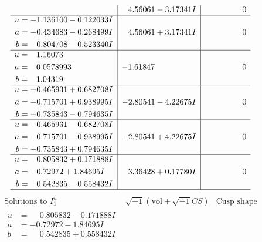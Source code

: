 \documentclass[1p]{elsarticle_modified}
\theoremstyle{definition}
\newcommand{\I}{\sqrt{-1}}
\begin{document}
$$\begin{array}{c|c|c}
 & \phantom{-}4.56061 - 3.17341 I & \phantom{-0.000000 } 0 \\ \hline\begin{aligned}
u &= -1.136100 - 0.122033 I \\
a &= -0.434683 - 0.268499 I \\
b &= \phantom{-}0.804708 - 0.523340 I\end{aligned}
 & \phantom{-}4.56061 + 3.17341 I & \phantom{-0.000000 } 0 \\ \hline\begin{aligned}
u &= \phantom{-}1.16073\phantom{ +0.000000I} \\
a &= \phantom{-}0.0578993\phantom{ +0.000000I} \\
b &= \phantom{-}1.04319\phantom{ +0.000000I}\end{aligned}
 & -1.61847\phantom{ +0.000000I} & \phantom{-0.000000 } 0 \\ \hline\begin{aligned}
u &= -0.465931 + 0.682708 I \\
a &= -0.715701 + 0.938995 I \\
b &= -0.735843 - 0.794635 I\end{aligned}
 & -2.80541 - 4.22675 I & \phantom{-0.000000 } 0 \\ \hline\begin{aligned}
u &= -0.465931 - 0.682708 I \\
a &= -0.715701 - 0.938995 I \\
b &= -0.735843 + 0.794635 I\end{aligned}
 & -2.80541 + 4.22675 I & \phantom{-0.000000 } 0 \\ \hline\begin{aligned}
u &= \phantom{-}0.805832 + 0.171888 I \\
a &= -0.72972 + 1.84695 I \\
b &= \phantom{-}0.542835 - 0.558432 I\end{aligned}
 & \phantom{-}3.36428 + 0.17780 I & \phantom{-0.000000 } 0\\
 \hline 
 \end{array}$$\newpage$$\begin{array}{c|c|c}  
\text{Solutions to }I^u_{1}& \I (\text{vol} + \sqrt{-1}CS) & \text{Cusp shape}\\
 \hline 
\begin{aligned}
u &= \phantom{-}0.805832 - 0.171888 I \\
a &= -0.72972 - 1.84695 I \\
b &= \phantom{-}0.542835 + 0.558432 I\end{aligned}

\end{array}$$
\end{document}
